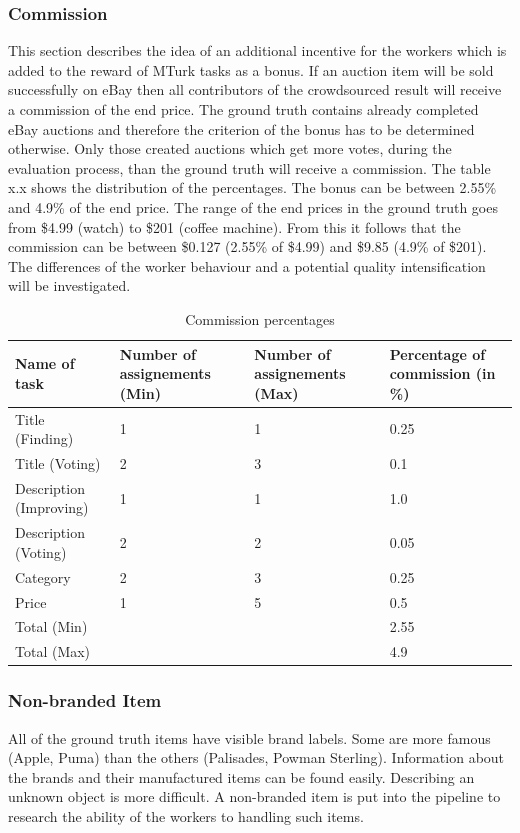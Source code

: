 \subsubsection{Commission}
This section describes the idea of an additional incentive for the workers which is added to the reward of MTurk tasks as a bonus. If an auction item will be sold successfully on eBay then all contributors of the crowdsourced result will receive a commission of the end price. The ground truth contains already completed eBay auctions and therefore the criterion of the bonus has to be determined otherwise. Only those created auctions which get more votes, during the evaluation process, than the ground truth will receive a commission. The table x.x shows the distribution of the percentages. The bonus can be between 2.55\% and 4.9\% of the end price. The range of the end prices in the ground truth goes from \$4.99 (watch) to \$201 (coffee machine). From this it follows that the commission can be between \$0.127 (2.55\% of \$4.99) and \$9.85 (4.9\% of \$201). The differences of the worker behaviour and a potential quality intensification will be investigated. 
\begin{table}[h!]
	\begin{center}
	\begin{tabular}{| p{3.25cm} | p{3.25cm} | p{3.25cm} | p{3.25cm} |}
		\hline
		Name of task & Number of assignements (Min) & Number of assignements (Max) & Percentage of commission (in \%) \\
		\hline
		Title (Finding) & 1 & 1 & 0.25 \\
		\hline
		Title (Voting) & 2 & 3 & 0.1 \\
		\hline
		Description (Improving) & 1 & 1 & 1.0 \\
		\hline
		Description (Voting) & 2 & 2 & 0.05 \\
		\hline
		Category & 2 & 3 & 0.25 \\
		\hline
		Price & 1 & 5 & 0.5 \\
		\hline
		Total (Min) & & & 2.55 \\
		\hline
		Total (Max) & & & 4.9 \\
		\hline
	\end{tabular}
	\end{center}
	\caption{Commission percentages}
\end{table}

\subsubsection{Non-branded Item}
All of the ground truth items have visible brand labels. Some are more famous (Apple, Puma) than the others (Palisades, Powman Sterling). Information about the brands and their manufactured items can be found easily. Describing an unknown object is more difficult. A non-branded item is put into the pipeline to research the ability of the workers to handling such items. 

